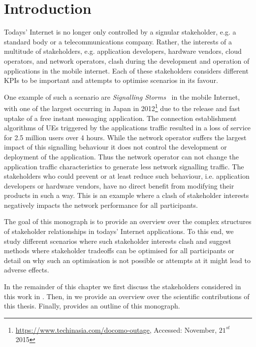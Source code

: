 \chapter{Introduction}\label{chap:introduction}

Todays' Internet is no longer only controlled by a signular stakeholder, e.g. a standard body or a telecommunications company.
Rather, the interests of a multitude of stakeholders, e.g. application developers, hardware vendors, cloud operators, and network operators, clash during the development and operation of applications in the mobile internet. 
Each of these stakeholders considers different \glspl{KPI} to be important and attempts to optimise scenarios in its favour. 

One example of such a scenario are \emph{Signalling Storms}~\cite{Huawei2011} in the mobile Internet, with one of the largest occurring in Japan in 2012\footnote{\url{https://www.techinasia.com/docomo-outage}, Accessed: November, \(21^{st}\) 2015} due to the release and fast uptake of a free instant messaging application.
The connection establishment algorithms of \glspl{UE} triggered by the applications traffic resulted in a loss of service for 2.5 million users over 4 hours.
While the network operator suffers the largest impact of this signalling behaviour it does not control the development or deployment of the application.
Thus the network operator can not change the application traffic characteristics to generate less network signalling traffic. 
The stakeholders who could prevent or at least reduce such behaviour, i.e. application developers or hardware vendors, have no direct benefit from modifying their products in such a way.
This is an example where a clash of stakeholder interests negatively impacts the network performance for all participants.

The goal of this monograph is to provide an overview over the complex structures of stakeholder relationships in todays' Internet applications.
To this end, we study different scenarios where such stakeholder interests clash and suggest methods where stakeholder tradeoffs can be optimised for all participants or detail on why such an optimisation is not possible or attempts at it might lead to adverse effects.

In the remainder of this chapter we first discuss the stakeholders considered in this work in .
Then, in  we provide an overview over the scientific contributions of this thesis.
Finally,  provides an outline of this monograph.

